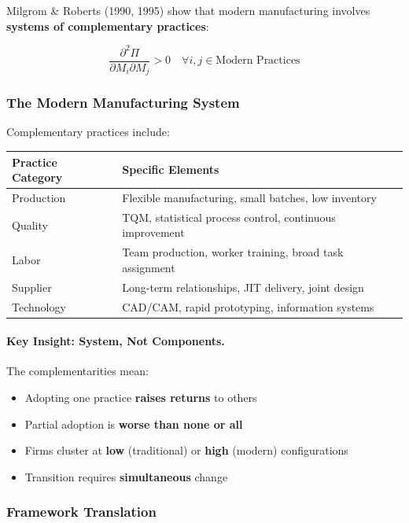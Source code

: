 Milgrom \& Roberts (1990, 1995) show that modern manufacturing involves 
\textbf{systems of complementary practices}:

\begin{equation}
\boxed{
\frac{\partial^2 \Pi}{\partial M_i \partial M_j} > 0 \quad \forall i, j \in \text{Modern Practices}
}
\label{eq:mr-manufacturing}
\end{equation}

\subsubsection{The Modern Manufacturing System}

Complementary practices include:

\begin{center}
\renewcommand{\arraystretch}{1.3}
\begin{tabular}{|l|l|}
\hline
\textbf{Practice Category} & \textbf{Specific Elements} \\
\hline
Production & Flexible manufacturing, small batches, low inventory \\
Quality & TQM, statistical process control, continuous improvement \\
Labor & Team production, worker training, broad task assignment \\
Supplier & Long-term relationships, JIT delivery, joint design \\
Technology & CAD/CAM, rapid prototyping, information systems \\
\hline
\end{tabular}
\end{center}

\paragraph{Key Insight: System, Not Components.}
The complementarities mean:
\begin{itemize}
    \item Adopting one practice \textbf{raises returns} to others
    \item Partial adoption is \textbf{worse than none or all}
    \item Firms cluster at \textbf{low} (traditional) or \textbf{high} (modern) configurations
    \item Transition requires \textbf{simultaneous} change
\end{itemize}

\subsubsection{Framework Translation}

